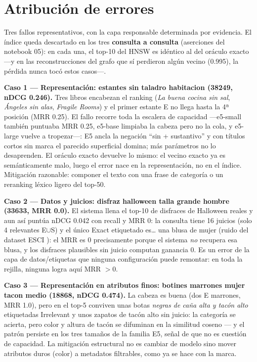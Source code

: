 \documentclass[10pt,twocolumn]{article}
\begin{document}
\section{Atribución de errores}
\label{sec:atribucion}

Tres fallos representativos, con la capa responsable determinada por
evidencia. El índice queda descartado en los tres \textbf{consulta a
consulta} (aserciones del notebook 05): en cada una, el top-10 del HNSW es
idéntico al del oráculo exacto ---y en las reconstrucciones del grafo que
sí perdieron algún vecino (0.995), la pérdida nunca tocó estos casos---.

\textbf{Caso 1 --- Representación: \guillemotleft estantes sin taladro
habitacion\guillemotright{} (38249, nDCG 0.246).} Tres libros encabezan el
ranking (\emph{La buena cocina sin sal}, \emph{Ángeles sin alas},
\emph{Fragile Rooms}) y el primer estante E no llega hasta la 4ª posición
(MRR 0.25). El fallo recorre toda la escalera de capacidad ---e5-small
también puntuaba MRR 0.25, e5-base limpiaba la cabeza pero no la cola, y
e5-large vuelve a tropezar---: E5 ancla la negación ``sin + sustantivo'' y
con títulos cortos sin marca el parecido superficial domina; más parámetros
no lo desaprenden. El oráculo exacto devuelve lo mismo: el vecino exacto ya
es semánticamente malo, luego el error nace en la representación, no en el
índice. Mitigación razonable: componer el texto con una frase de categoría o
un reranking léxico ligero del top-50.

\textbf{Caso 2 --- Datos y juicios: \guillemotleft disfraz halloween talla
grande hombre\guillemotright{} (33633, MRR 0.0).} El sistema llena el top-10
de disfraces de Halloween reales y aun así puntúa nDCG 0.042 con recall y
MRR 0: la consulta tiene 16 juicios (solo 4 relevantes E$\cup$S) y el único
Exact etiquetado es\ldots{} una blusa de mujer (ruido del dataset ESCI
\cite{reddy2022}): el MRR es 0 precisamente porque el sistema \emph{no}
recupera esa blusa, y los disfraces plausibles sin juicio computan ganancia
0. Es un error de la capa de datos/etiquetas que ninguna configuración puede
remontar: en toda la rejilla, ninguna logra aquí MRR $> 0$.

\textbf{Caso 3 --- Representación en atributos finos: \guillemotleft botines
marrones mujer tacon medio\guillemotright{} (18868, nDCG 0.474).} La cabeza
es buena (dos E marrones, MRR 1.0), pero en el top-5 conviven unas botas
\emph{negras de caña alta y tacón alto} etiquetadas Irrelevant y unos
zapatos de tacón alto sin juicio: la categoría se acierta, pero color y
altura de tacón se difuminan en la similitud coseno --- y el patrón persiste
en los tres tamaños de la familia E5, señal de que no es cuestión de
capacidad. La mitigación estructural no es cambiar de modelo sino mover
atributos duros (color) a metadatos filtrables, como ya se hace con la
marca.
\end{document}
